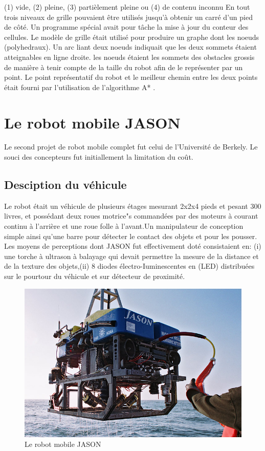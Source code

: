 (1) vide,
(2) pleine,
(3) partièlement pleine ou (4) de contenu inconnu
En tout trois niveaux de grille pouvaient être utilisés jusqu'à obtenir un carré d'un pied de côté. Un programme spécial avait pour tâche la mise à jour du conteur des cellules. Le modèle de grille était utilisé pour produire un graphe dont les noeuds (polyhedraux). Un arc liant deux noeuds indiquait que les deux sommets étaient atteignables  en ligne droite.
les noeuds étaient les sommets des obstacles grossis de manière à tenir compte de la taille du robot afin de le représenter par un point.
Le point représentatif du robot  et le meilleur chemin entre les deux points était fourni par l'utilisation de l'algorithme A* .
\newpage
\section{Le robot mobile JASON}
Le second projet de robot mobile complet fut celui de l'Université de Berkely. Le souci des concepteurs fut initiallement la limitation du coût.
\subsection{Desciption du véhicule}
Le robot était un véhicule de plusieurs étages mesurant 2x2x4 pieds et pesant 300 livres, et possédant deux roues motrice"s commandées par des moteurs à courant continu à l'arrière et une roue folle à l'avant.Un manipulateur de conception simple ainsi qu'une barre pour détecter le contact des objets et pour les pousser.
Les moyens de perceptions dont JASON fut effectivement doté consistaient en:
(i) une torche à ultrason à balayage qui devait permettre la mesure de la distance et de la texture des objets,(ii) 8 diodes électro-Iuminescentes en (LED) distribuées sur le pourtour du véhicule et sur détecteur de proximité.
\begin{figure}[h]
    \centering
    \includegraphics[width=14cm]{assets/Chapter2/jason1.jpeg}
    \caption{Le robot mobile JASON \cite{OceanRobotsJason}}
    \label{jason1}

\end{figure}

